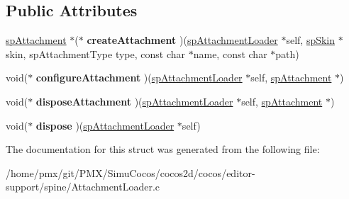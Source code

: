 \subsection*{Public Attributes}
\begin{DoxyCompactItemize}
\item 
\mbox{\label{struct__spAttachmentLoaderVtable_a0aa100d6521cc375c49cff51d6b4512f}} 
\hyperlink{structspAttachment}{sp\+Attachment} $\ast$($\ast$ {\bfseries create\+Attachment} )(\hyperlink{structspAttachmentLoader}{sp\+Attachment\+Loader} $\ast$self, \hyperlink{structspSkin}{sp\+Skin} $\ast$skin, sp\+Attachment\+Type type, const char $\ast$name, const char $\ast$path)
\item 
\mbox{\label{struct__spAttachmentLoaderVtable_a6b6952a4b455aed0a031dca004c9eafa}} 
void($\ast$ {\bfseries configure\+Attachment} )(\hyperlink{structspAttachmentLoader}{sp\+Attachment\+Loader} $\ast$self, \hyperlink{structspAttachment}{sp\+Attachment} $\ast$)
\item 
\mbox{\label{struct__spAttachmentLoaderVtable_a31264e2b21ab9617ea9e66d29e6ec317}} 
void($\ast$ {\bfseries dispose\+Attachment} )(\hyperlink{structspAttachmentLoader}{sp\+Attachment\+Loader} $\ast$self, \hyperlink{structspAttachment}{sp\+Attachment} $\ast$)
\item 
\mbox{\label{struct__spAttachmentLoaderVtable_a53210e3ba1d7eb421bc8736b1c354d24}} 
void($\ast$ {\bfseries dispose} )(\hyperlink{structspAttachmentLoader}{sp\+Attachment\+Loader} $\ast$self)
\end{DoxyCompactItemize}


The documentation for this struct was generated from the following file\+:\begin{DoxyCompactItemize}
\item 
/home/pmx/git/\+P\+M\+X/\+Simu\+Cocos/cocos2d/cocos/editor-\/support/spine/Attachment\+Loader.\+c\end{DoxyCompactItemize}
